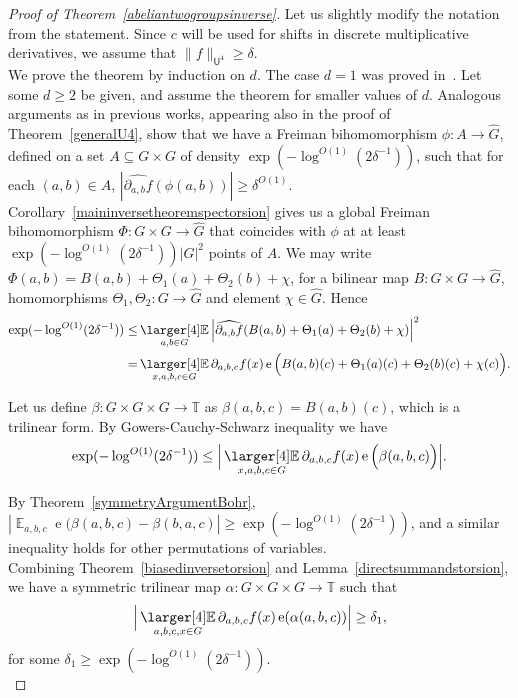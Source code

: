 \documentclass[a4paper,11pt]{article}
\numberwithin{theorem}{section}
\theoremstyle{definition}
\newcommand{\on}[1]{
	\operatorname{#1}
}
\newcommand\ex{\mathop{\mathbb{E}}}
\newcommand{\exx}{
  \mathop{
    \mathchoice{\vcenter{\hbox{\larger[4]$\mathbb{E}$}}}
               {\kern0pt\mathbb{E}}
               {\kern0pt\mathbb{E}}
               {\kern0pt\mathbb{E}}
  }\displaylimits
}
\begin{document}
\begin{proof}[Proof of Theorem~\ref{abeliantwogroupsinverse}]
    Let us slightly modify the notation from the statement. Since $c$ will be used for shifts in discrete multiplicative derivatives, we assume that $\|f\|_{\mathsf{U}^4} \geq \delta$.\\
    
    We prove the theorem by induction on $d$. The case $d = 1$ was proved in~\cite{newU4}. Let some $d \geq 2$ be given, and assume the theorem for smaller values of $d$. Analogous arguments as in previous works, appearing also in the proof of Theorem~\ref{generalU4}, show that we have a Freiman bihomomorphism $\phi : A \to \hat{G}$, defined on a set $A \subseteq G \times G$ of density $\exp(-\log^{O(1)}(2\delta^{-1}))$, such that for each $(a,b) \in A$, $|\widehat{\partial_{a,b}f}(\phi(a,b))| \geq \delta^{O(1)}$. Corollary~\ref{maininversetheoremspectorsion} gives us a global Freiman bihomomorphism $\Phi : G\times G \to \hat{G}$ that coincides with $\phi$ at at least $\exp(-\log^{O(1)}(2\delta^{-1}))|G|^2$ points of $A$. We may write $\Phi(a,b) = B(a,b) + \Theta_1(a) + \Theta_2(b) + \chi$, for a bilinear map $B : G \times G \to \hat{G}$, homomorphisms $\Theta_1, \Theta_2 : G \to \hat{G}$ and element $\chi \in \hat{G}$. Hence
    \begin{align*}\exp(-\log^{O(1)}(2\delta^{-1})) \leq &\exx_{a,b \in G} \Big|\widehat{\partial_{a,b}f}(B(a,b) + \Theta_1(a) + \Theta_2(b) + \chi)\Big|^2\\
    = &\exx_{x,a,b,c \in G}  \partial_{a,b,c} f(x) \on{e}\Big(B(a,b)(c) + \Theta_1(a)(c) + \Theta_2(b)(c) + \chi(c)\Big).\end{align*}

    Let us define $\beta : G \times G \times G \to \mathbb{T}$ as $\beta(a,b,c) = B(a,b)(c)$, which is a trilinear form. By Gowers-Cauchy-Schwarz inequality we have
   \[\exp(-\log^{O(1)}(2\delta^{-1})) \leq \Big|\exx_{x,a,b,c \in G}  \partial_{a,b,c} f(x) \on{e}\Big(\beta(a,b, c) \Big)\Big|.\] 

    By Theorem~\ref{symmetryArgumentBohr}, $|\ex_{a,b,c} \on{e}(\beta(a,b, c) - \beta(b,a, c)| \geq \exp(-\log^{O(1)}(2\delta^{-1}))$, and a similar inequality holds for other permutations of variables.\\
    
    Combining Theorem~\ref{biasedinversetorsion} and Lemma~\ref{directsummandstorsion}, we have a symmetric trilinear map $\alpha : G \times G \times G \to \mathbb{T}$ such that 
    \begin{equation}\label{maincorrelationtorsioninverse}\Big|\exx_{a,b,c,x \in G} \partial_{a,b,c} f(x) \on{e}(\alpha(a,b,c))\Big| \geq \delta_1,\end{equation}
    for some $\delta_1 \geq \exp(-\log^{O(1)}(2\delta^{-1}))$.\\


\end{proof}
\end{document}
